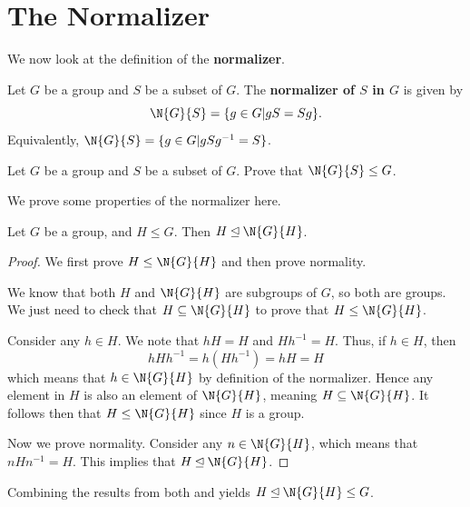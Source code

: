 \section{The Normalizer}
We now look at the definition of the \textbf{normalizer}.
\begin{definition}
    Let $G$ be a group and $S$ be a subset of $G$. The \textbf{normalizer of $S$ in $G$} is given by
    \[
        \N{G}{S} = \{g \in G \vert gS = Sg \}.
    \]
    Equivalently, $\N{G}{S} = \{g \in G \vert gSg^{-1} = S \}$.
\end{definition}
\begin{exercise}\label{exercise-normalizer-is-subgroup-of-main-group}
    Let $G$ be a group and $S$ be a subset of $G$. Prove that $\N{G}{S} \leq G$.
\end{exercise}

\newpage

We prove some properties of the normalizer here.
\begin{proposition}\label{prop-subgroup-is-a-normal-subgroup-of-normalizer}
    Let $G$ be a group, and $H \leq G$. Then $H \unlhd \N{G}{H}$.
\end{proposition}
\begin{proof}
    We first prove $H \leq \N{G}{H}$ and then prove normality.

    We know that both $H$ and $\N{G}{H}$ are subgroups of $G$, so both are groups. We just need to check that $H \subseteq \N{G}{H}$ to prove that $H \leq \N{G}{H}$.

    Consider any $h \in H$. We note that $hH = H$ and $Hh^{-1} = H$. Thus, if $h \in H$, then
    \[
        hHh^{-1} = h(Hh^{-1}) = hH = H
    \]
    which means that $h \in \N{G}{H}$ by definition of the normalizer. Hence any element in $H$ is also an element of $\N{G}{H}$, meaning $H \subseteq \N{G}{H}$. It follows then that $H \leq \N{G}{H}$ since $H$ is a group.

    Now we prove normality. Consider any $n \in \N{G}{H}$, which means that $nHn^{-1} = H$. This implies that $H \unlhd \N{G}{H}$.
\end{proof}
\begin{remark}
    Combining the results from both  and  yields $H \unlhd \N{G}{H} \leq G$.
\end{remark}

